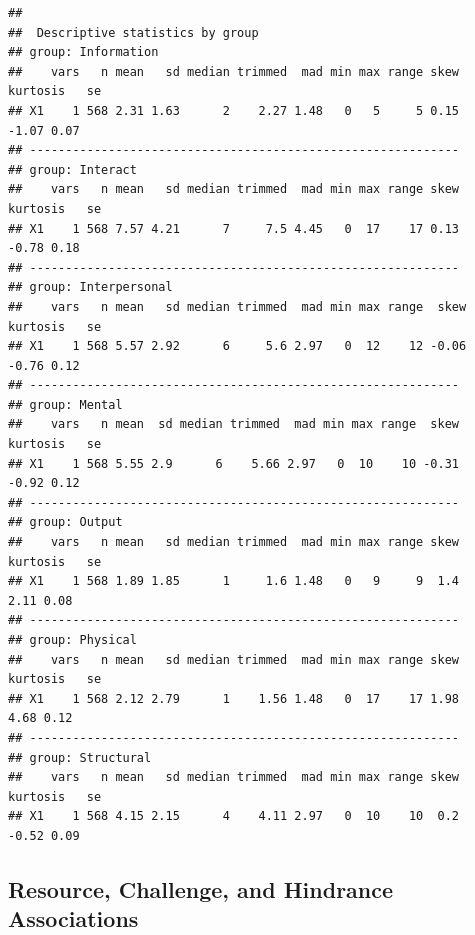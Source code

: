 \documentclass[
  man]{apa6}
\begin{document}
\begin{verbatim}
## 
##  Descriptive statistics by group 
## group: Information
##    vars   n mean   sd median trimmed  mad min max range skew kurtosis   se
## X1    1 568 2.31 1.63      2    2.27 1.48   0   5     5 0.15    -1.07 0.07
## ------------------------------------------------------------ 
## group: Interact
##    vars   n mean   sd median trimmed  mad min max range skew kurtosis   se
## X1    1 568 7.57 4.21      7     7.5 4.45   0  17    17 0.13    -0.78 0.18
## ------------------------------------------------------------ 
## group: Interpersonal
##    vars   n mean   sd median trimmed  mad min max range  skew kurtosis   se
## X1    1 568 5.57 2.92      6     5.6 2.97   0  12    12 -0.06    -0.76 0.12
## ------------------------------------------------------------ 
## group: Mental
##    vars   n mean  sd median trimmed  mad min max range  skew kurtosis   se
## X1    1 568 5.55 2.9      6    5.66 2.97   0  10    10 -0.31    -0.92 0.12
## ------------------------------------------------------------ 
## group: Output
##    vars   n mean   sd median trimmed  mad min max range skew kurtosis   se
## X1    1 568 1.89 1.85      1     1.6 1.48   0   9     9  1.4     2.11 0.08
## ------------------------------------------------------------ 
## group: Physical
##    vars   n mean   sd median trimmed  mad min max range skew kurtosis   se
## X1    1 568 2.12 2.79      1    1.56 1.48   0  17    17 1.98     4.68 0.12
## ------------------------------------------------------------ 
## group: Structural
##    vars   n mean   sd median trimmed  mad min max range skew kurtosis   se
## X1    1 568 4.15 2.15      4    4.11 2.97   0  10    10  0.2    -0.52 0.09
\end{verbatim}

\hypertarget{resource-challenge-and-hindrance-associations}{%
\subsection{Resource, Challenge, and Hindrance Associations}\label{resource-challenge-and-hindrance-associations}}
\end{document}
